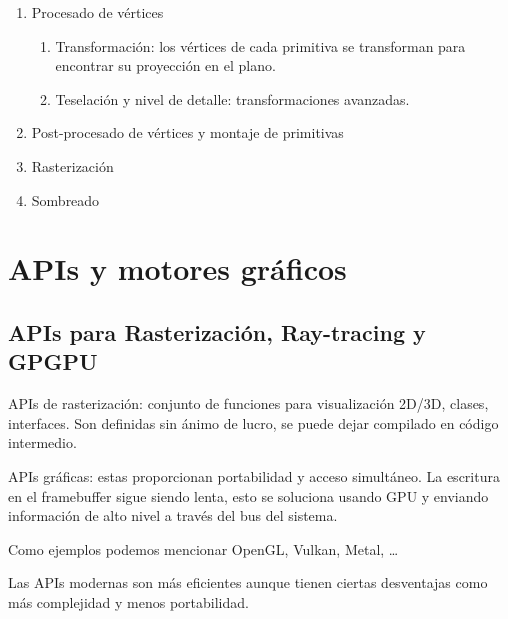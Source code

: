 \documentclass[12pt]{report} %
\providecommand{\tightlist}{%
  \setlength{\itemsep}{0pt}\setlength{\parskip}{0pt}}
\begin{document}
\begin{enumerate}
\def\labelenumi{\arabic{enumi}.}
\tightlist
\item
  Procesado de vértices

  \begin{enumerate}
  \def\labelenumii{\arabic{enumii}.}
  \tightlist
  \item
    Transformación: los vértices de cada primitiva se transforman para
    encontrar su proyección en el plano.\\
  \item
    Teselación y nivel de detalle: transformaciones avanzadas.\\
  \end{enumerate}
\item
  Post-procesado de vértices y montaje de primitivas\\
\item
  Rasterización\\
\item
  Sombreado
\end{enumerate}


\hypertarget{apis-y-motores-gruxe1ficos}{%
\section{APIs y motores gráficos}\label{apis-y-motores-gruxe1ficos}}

\hypertarget{apis-para-rasterizaciuxf3n-ray-tracing-y-gpgpu}{%
\subsection{APIs para Rasterización, Ray-tracing y
GPGPU}\label{apis-para-rasterizaciuxf3n-ray-tracing-y-gpgpu}}

APIs de rasterización: conjunto de funciones para visualización 2D/3D,
clases, interfaces. Son definidas sin ánimo de lucro, se puede dejar
compilado en código intermedio.

APIs gráficas: estas proporcionan portabilidad y acceso simultáneo. La
escritura en el framebuffer sigue siendo lenta, esto se soluciona usando
GPU y enviando información de alto nivel a través del bus del sistema.

Como ejemplos podemos mencionar OpenGL, Vulkan, Metal, \ldots{}

Las APIs modernas son más eficientes aunque tienen ciertas desventajas
como más complejidad y menos portabilidad.
\end{document}
